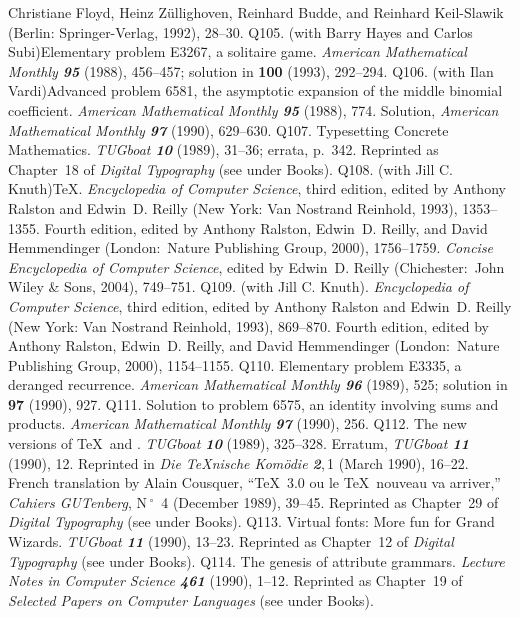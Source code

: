  Christiane Floyd, Heinz Z\"ullighoven, Reinhard Budde, and Reinhard
 Keil-Slawik (Berlin: Springer-Verlag, 1992), 28--30.
\p Q105. (with Barry Hayes and Carlos Subi)\xskip Elementary problem E3267,
 a solitaire game.
 {\sl American Mathematical Monthly\/ \bf 95} (1988), 456--457;
 solution in {\bf100} (1993), 292--294.
\p Q106. (with Ilan Vardi)\xskip Advanced problem 6581, the asymptotic
 expansion of the middle binomial coefficient.
 {\sl American Mathematical Monthly\/ \bf95} (1988), 774. Solution,
 {\sl American Mathematical Monthly\/ \bf97} (1990), 629--630.
\p Q107. Typesetting Concrete Mathematics. {\sl TUGboat\/ \bf10} (1989),
 31--36; errata, p.~342.
 Reprinted as Chapter~18 of {\sl Digital Typography\/} (see under Books).
\p *Q108. (with Jill C. Knuth)\xskip \TeX. {\sl Encyclopedia of Computer
 Science}, third edition, edited by Anthony Ralston
 and Edwin~D. Reilly (New York: Van Nostrand Reinhold, 1993), 1353--1355.
 Fourth edition, edited by Anthony Ralston, Edwin~D. Reilly, and David
 Hemmendinger (London:\ Nature Publishing Group, 2000), 1756--1759.
 {\sl Concise Encyclopedia of Computer Science}, edited by Edwin~D.
 Reilly (Chichester:\ John Wiley \& Sons, 2004), 749--751.
\p *Q109. (with Jill C. Knuth)\xskip \MF. {\sl Encyclopedia of Computer
 Science}, third edition, edited by Anthony Ralston
 and Edwin~D. Reilly (New York: Van Nostrand Reinhold, 1993), 869--870.
 Fourth edition, edited by Anthony Ralston, Edwin~D. Reilly, and David
 Hemmendinger (London:\ Nature Publishing Group, 2000), 1154--1155.
\p Q110. Elementary problem E3335, a deranged recurrence.
 {\sl American Mathematical Monthly\/ \bf 96} (1989), 525;
 solution in {\bf97} (1990), 927.
\p Q111. Solution to problem 6575, an identity involving sums and
 products. {\sl American Mathematical Monthly\/ \bf 97} (1990), 256.
\p Q112. The new versions of \TeX\ and \MF. {\sl TUGboat\/ \bf10} (1989),
 325--328. Erratum, {\sl TUGboat\/ \bf11} (1990), 12. Reprinted in
 {\sl Die \TeX nische Kom\"odie\/ \bf2},\,1 (March 1990), 16--22.
 French translation by Alain Cousquer, ``\TeX\ 3.0 ou le \TeX\ nouveau
 va arriver,'' {\sl Cahiers GUTenberg}, N$\,^\circ$~4 (December 1989), 39--45.
 Reprinted as Chapter~29 of {\sl Digital Typography\/} (see under Books).
\p Q113. Virtual fonts: More fun for Grand Wizards. {\sl TUGboat\/ \bf11}
 (1990), 13--23.
 Reprinted as Chapter~12 of {\sl Digital Typography\/} (see under Books).
\p Q114. The genesis of attribute grammars. {\sl Lecture Notes in Computer
 Science \bf461} (1990), 1--12. %
 Reprinted as Chapter~19 of {\sl Selected Papers on
 Computer Languages\/} (see under Books).
